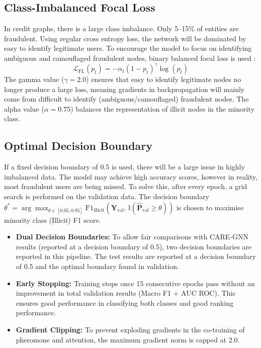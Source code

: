 \subsection{Class-Imbalanced Focal Loss}
In credit graphs, there is a large class imbalance. Only 5--15\% of entities are fraudulent. Using regular cross entropy loss, the network will be dominated by easy to identify legitimate users. To encourage the model to focus on identifying ambiguous and camouflaged fraudulent nodes, binary balanced focal loss is used \cite{lin2017focal}:
\begin{equation}
    \mathcal{L}_{\text{FL}}(p_t) = -\alpha_t \left(1 - p_t\right)^\gamma \log(p_t)
    \label{eq:focal_loss}
\end{equation}
The gamma value ($\gamma = 2.0$) ensures that easy to identify legitimate nodes no longer produce a large loss, meaning gradients in backpropagation will mainly come from difficult to identify (ambiguous/camouflaged) fraudulent nodes. The alpha value ($\alpha = 0.75$) balances the representation of illicit nodes in the minority class.

\subsection{Optimal Decision Boundary}
If a fixed decision boundary of 0.5 is used, there will be a large issue in highly imbalanced data. The model may achieve high accuracy scores, however in reality, most fraudulent users are being missed. To solve this, after every epoch, a grid search is performed on the validation data. The decision boundary $\theta^* = \arg\max_{\theta \in [0.05, 0.95]} \text{F1}_{\text{illicit}}\left(\mathbf{Y}_{\text{val}}, \, \mathbb{I}\left(\hat{\mathbf{P}}_{\text{val}} \ge \theta\right)\right)$ is chosen to maximise minority class (Illicit) F1 score.

\begin{itemize}
    \item \textbf{Dual Decision Boundaries:} To allow fair comparisons with CARE-GNN results (reported at a decision boundary of 0.5), two decision boundaries are reported in this pipeline. The test results are reported at a decision boundary of 0.5 and the optimal boundary found in validation.
    \item \textbf{Early Stopping:} Training stops once 15 consecutive epochs pass without an improvement in total validation results (Macro F1 + AUC ROC). This ensures good performance in classifying both classes and good ranking performance.
    \item \textbf{Gradient Clipping:} To prevent exploding gradients in the co-training of pheromone and attention, the maximum gradient norm is capped at 2.0.
\end{itemize}

